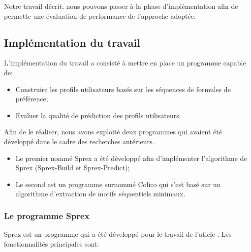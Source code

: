 \documentclass[a4paper,12pt,openany,oneside]{article}
\begin{document}
Notre travail décrit, nous pouvons passer à la phase d'implémentation afin de permette une évaluation de performance de l'approche adoptée.

\subsection{Implémentation du travail}
L'implémentation du travail a consisté à mettre en place un programme capable de:\\

\begin{itemize}
\item Construire les profils utilisateurs basés sur les séquences de formules de préférence;
\item Evaluer la qualité de prédiction des profils utilisateurs.\\
\end{itemize}

Afin de le réaliser, nous avons exploité deux programmes qui avaient été développé dans le cadre des recherches antérieurs.\\

\begin{itemize}
\item Le premier nommé Sprex a été développé afin d'implémenter l'algorithme de Sprex (Sprex-Build et Sprex-Predict);
\item Le second est un programme surnommé Colico qui s'est basé sur un algorithme d'extraction de motifs séquentiels minimaux.
\end{itemize}





\subsubsection{Le programme Sprex}
Sprex est un programme qui a été développé pour le travail de l'aticle \cite{..}. Les fonctionnalités principales sont:\\
\end{document}
